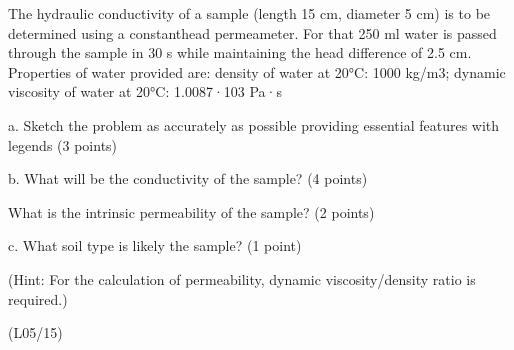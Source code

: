 \documentclass[letterpaper,10pt,english]{jupyterBook}
\begin{document}
\sphinxAtStartPar
The hydraulic conductivity of a sample (length 15 cm, diameter 5 cm) is to be determined using a constant\sphinxhyphen{}head permeameter. For that 250 ml water is passed through the sample in 30 s while maintaining the head difference of 2.5 cm. Properties of water provided are:
density of water at 20°C: 1000 kg/m3;                                                  dynamic viscosity of water at 20°C: 1.0087·10\sphinxhyphen{}3 Pa·s

\sphinxAtStartPar
a.  Sketch the problem as accurately as possible providing essential features with legends (3 points)

\sphinxAtStartPar
b. What will be the conductivity of the sample? (4 points)

\sphinxAtStartPar
What is the intrinsic permeability of the sample? (2 points)

\sphinxAtStartPar
c. What soil type is likely the sample? (1 point)

\sphinxAtStartPar
(Hint: For the calculation of permeability, dynamic viscosity/density ratio is required.)

\sphinxAtStartPar
{} \sphinxhyphen{}

\sphinxAtStartPar
{} (L05/15)

\sphinxAtStartPar
 
\end{document}
